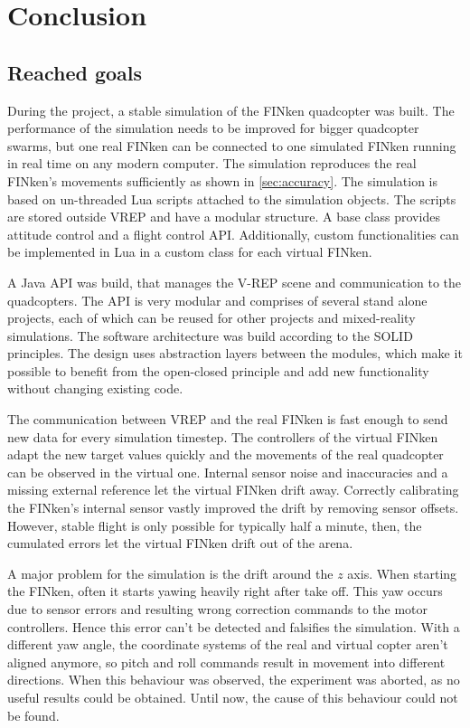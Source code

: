 \chapter{Conclusion}
\label{chap:conclusion}

\section{Reached goals}
\label{sec:conclusionGoals}
During the project, a stable simulation of the FINken quadcopter was built.
The performance of the simulation needs to be improved for bigger quadcopter swarms, but one real FINken can be connected to one simulated FINken running in real time on any modern computer.
The simulation reproduces the real FINken's movements sufficiently as shown in \ref{sec:accuracy}.
The simulation is based on un-threaded Lua scripts attached to the simulation objects.
The scripts are stored outside VREP and have a modular structure.
A base class provides attitude control and a flight control API.
Additionally, custom functionalities can be implemented in Lua in a custom class for each virtual FINken.


A Java API was build, that manages the V-REP scene and communication to the quadcopters. 
The API is very modular and comprises of several stand alone projects, each of which can be reused for other projects and mixed-reality simulations. The software architecture was build according to the  SOLID \cite{solid} principles.
The design uses abstraction layers between the modules, which make it possible to benefit from the open-closed principle and add new functionality without changing existing code.

The communication between VREP and the real FINken is fast enough to send new data for every simulation timestep.
The controllers of the virtual FINken adapt the new target values quickly and the movements of the real quadcopter can be observed in the virtual one.
Internal sensor noise and inaccuracies and a missing external reference let the virtual FINken drift away.
Correctly calibrating the FINken's internal sensor vastly improved the drift by removing sensor offsets.
However, stable flight is only possible for typically half a minute, then, the cumulated errors let the virtual FINken drift out of the arena.

A major problem for the simulation is the drift around the $z$ axis.
When starting the FINken, often it starts yawing heavily right after take off.
This yaw occurs due to sensor errors and resulting wrong correction commands to the motor controllers.
Hence this error can't be detected and falsifies the simulation.
With a different yaw angle, the coordinate systems of the real and virtual copter aren't aligned anymore, so pitch and roll commands result in movement into different directions.
When this behaviour was observed, the experiment was aborted, as no useful results could be obtained.
Until now, the cause of this behaviour could not be found.





